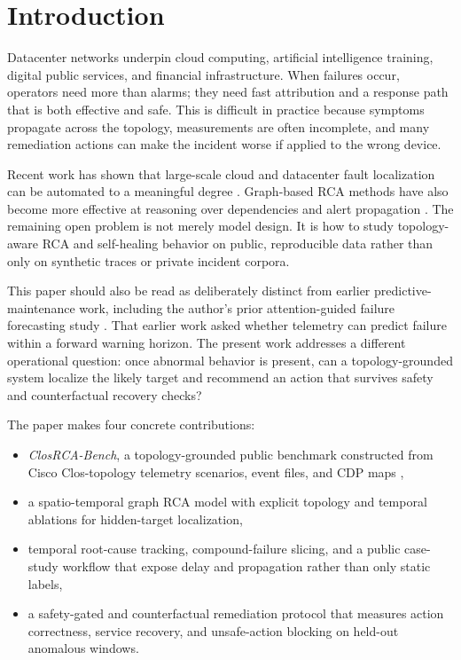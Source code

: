 \documentclass[conference]{IEEEtran}
\begin{document}
\section{Introduction}
Datacenter networks underpin cloud computing, artificial intelligence training, digital public services, and financial infrastructure. When failures occur, operators need more than alarms; they need fast attribution and a response path that is both effective and safe. This is difficult in practice because symptoms propagate across the topology, measurements are often incomplete, and many remediation actions can make the incident worse if applied to the wrong device.

Recent work has shown that large-scale cloud and datacenter fault localization can be automated to a meaningful degree \cite{roy2017fault,li2021mining}. Graph-based RCA methods have also become more effective at reasoning over dependencies and alert propagation \cite{alertRCA2024,kipf2017semi}. The remaining open problem is not merely model design. It is how to study topology-aware RCA and self-healing behavior on public, reproducible data rather than only on synthetic traces or private incident corpora.

This paper should also be read as deliberately distinct from earlier predictive-maintenance work, including the author's prior attention-guided failure forecasting study \cite{ramasahayam2026prediction}. That earlier work asked whether telemetry can predict failure within a forward warning horizon. The present work addresses a different operational question: once abnormal behavior is present, can a topology-grounded system localize the likely target and recommend an action that survives safety and counterfactual recovery checks?

The paper makes four concrete contributions:
\begin{itemize}
\item \textit{ClosRCA-Bench}, a topology-grounded public benchmark constructed from Cisco Clos-topology telemetry scenarios, event files, and CDP maps \cite{putina2018telemetry,ciscoTelemetryRepo},
\item a spatio-temporal graph RCA model with explicit topology and temporal ablations for hidden-target localization,
\item temporal root-cause tracking, compound-failure slicing, and a public case-study workflow that expose delay and propagation rather than only static labels,
\item a safety-gated and counterfactual remediation protocol that measures action correctness, service recovery, and unsafe-action blocking on held-out anomalous windows.
\end{itemize}
\end{document}
